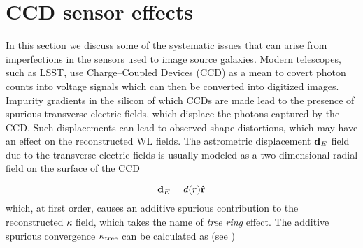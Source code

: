\section{CCD sensor effects}
\label{sec:7:ccd}
In this section we discuss some of the systematic issues that can arise from imperfections in the sensors used to image source galaxies. Modern telescopes, such as LSST, use Charge--Coupled Devices (CCD) \citep{CCDBook,LSST,LSSTOperations} as a mean to covert photon counts into voltage signals which can then be converted into digitized images. Impurity gradients in the silicon of which CCDs are made lead to the presence of spurious transverse electric fields, which displace the photons captured by the CCD. Such displacements can lead to observed shape distortions, which may have an effect on the reconstructed WL fields. The astrometric displacement $\mathbf{d}_E$ field due to the transverse electric fields is usually modeled as a two dimensional radial field \citep{PetriCCD} on the surface of the CCD

\begin{equation}
\label{eq:7:displ}
\mathbf{d}_E = d(r)\mathbf{\hat{r}}
\end{equation}
%
which, at first order, causes an additive spurious contribution to the reconstructed $\kappa$ field, which takes the name of \textit{tree ring} effect. The additive spurious convergence $\kappa_{\rm tree}$ can be calculated as (see \citep{PetriCCD})


